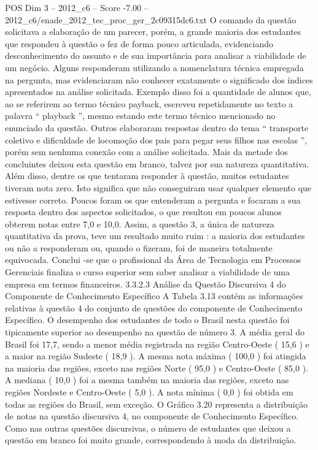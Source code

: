 \begin{textsample}{POS Dim 3 – 2012\_c6 – Score -7.00 – 2012\_c6/enade\_2012\_tec\_proc\_ger\_2c09315dc6.txt}
O comando da questão solicitava a elaboração de um parecer, porém, a grande maioria dos estudantes que respondeu à questão o fez de forma pouco articulada, evidenciando desconhecimento do assunto e de sua importância para analisar a viabilidade de um negócio.
Alguns responderam utilizando a nomenclatura técnica empregada na pergunta, mas evidenciaram não conhecer exatamente o significado dos índices apresentados na análise solicitada.
Exemplo disso foi a quantidade de alunos que, ao se referirem ao termo técnico payback, escreveu repetidamente no texto a palavra “ playback ”, mesmo estando este termo técnico mencionado no enunciado da questão.
Outros elaboraram respostas dentro do tema “ transporte coletivo e dificuldade de locomoção dos pais para pegar seus filhos nas escolas ”, porém sem nenhuma conexão com a análise solicitada.
Mais da metade dos concluintes deixou esta questão em branco, talvez por sua natureza quantitativa.
Além disso, dentre os que tentaram responder à questão, muitos estudantes tiveram nota zero.
Isto significa que não conseguiram usar qualquer elemento que estivesse correto.
Poucos foram os que entenderam a pergunta e focaram a sua resposta dentro dos aspectos solicitados, o que resultou em poucos alunos obterem notas entre 7,0 e 10,0.
Assim, a questão 3, a única de natureza quantitativa da prova, teve um resultado muito ruim : a maioria dos estudantes ou não a responderam ou, quando o fizeram, foi de maneira totalmente equivocada.
Conclui -se que o profissional da Área de Tecnologia em Processos Gerenciais finaliza o curso superior sem saber analisar a viabilidade de uma empresa em termos financeiros. 3.3.2.3 Análise da Questão Discursiva 4 do Componente de Conhecimento Específico A Tabela 3.13 contém as informações relativas à questão 4 do conjunto de questões do componente de Conhecimento Específico.
O desempenho dos estudantes de todo o Brasil nesta questão foi tipicamente superior ao desempenho na questão de número 3.
A média geral do Brasil foi 17,7, sendo a menor média registrada na região Centro-Oeste ( 15,6 ) e a maior na região Sudeste ( 18,9 ).
A mesma nota máxima ( 100,0 ) foi atingida na maioria das regiões, exceto nas regiões Norte ( 95,0 ) e Centro-Oeste ( 85,0 ).
A mediana ( 10,0 ) foi a mesma também na maioria das regiões, exceto nas regiões Nordeste e Centro-Oeste ( 5,0 ).
A nota mínima ( 0,0 ) foi obtida em todas as regiões do Brasil, sem exceção.
O Gráfico 3.20 representa a distribuição de notas na questão discursiva 4, no componente de Conhecimento Específico.
Como nas outras questões discursivas, o número de estudantes que deixou a questão em branco foi muito grande, correspondendo à moda da distribuição.

\end{textsample}
